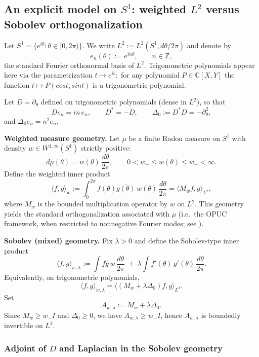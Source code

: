 \documentclass{amsart}
\numberwithin{equation}{section}
\theoremstyle{definition}
\theoremstyle{remark}
\begin{document}
\subsection{An explicit model on $S^1$: weighted $L^2$ versus Sobolev orthogonalization}
\label{subsec:S1-explicit}

Let $S^1=\{e^{i\theta}:\theta\in[0,2\pi)\}$.
We write $L^2:=L^2(S^1,d\theta/2\pi)$ and denote by
\[
e_n(\theta):=e^{in\theta},\qquad n\in\mathbb Z,
\]
the standard Fourier orthonormal basis of $L^2$.
Trigonometric polynomials appear here via the parametrization 
$t \mapsto e^{it}:$ for any 
polynomial $P \in \mathbb{C}[X,Y]$ the function 
$t \mapsto P(cost,sint)$ is a trigonometric polynomial.

Let $D=\partial_\theta$ defined on trigonometric polynomials (dense in $L^2$), so that
\[
De_n = in\,e_n,\qquad D^*=-D,\qquad \Delta_0:=D^*D=-\partial_\theta^2,
\]
and $\Delta_0 e_n = n^2 e_n$.

\medskip
\noindent\textbf{Weighted measure geometry.}
Let $\mu$ be a finite Radon measure on $S^1$ with density $w\in W^{1,\infty}(S^1)$
strictly positive:
\[
d\mu(\theta)=w(\theta)\,\frac{d\theta}{2\pi},\qquad
0<w_- \le w(\theta)\le w_+<\infty.
\]
Define the weighted inner product
\[
\langle f,g\rangle_{w}:=\int_0^{2\pi} f(\theta)\overline{g(\theta)}\,w(\theta)\,\frac{d\theta}{2\pi}
=\langle M_w f, g\rangle_{L^2},
\]
where $M_w$ is the bounded multiplication operator by $w$ on $L^2$.
This geometry yields the standard orthogonalization associated with $\mu$
(i.e.\ the OPUC framework, when restricted to nonnegative Fourier modes; see \cite{SimonOPUC1,Szego}).

\medskip
\noindent\textbf{Sobolev (mixed) geometry.}
Fix $\lambda>0$ and define the Sobolev-type inner product
\begin{equation}\label{eq:S1-mixed-Sobolev}
\langle f,g\rangle_{w,\lambda}
:=
\int f\overline{g}\,w\,\frac{d\theta}{2\pi}
\;+\;
\lambda\int f'(\theta)\,\overline{g'(\theta)}\,\frac{d\theta}{2\pi}.
\end{equation}
Equivalently, on trigonometric polynomials,
\begin{equation}\label{eq:Riesz-map-A}
\langle f,g\rangle_{w,\lambda}
=
\langle (M_w+\lambda \Delta_0)f, g\rangle_{L^2}.
\end{equation}
Set
\[
A_{w,\lambda}:=M_w+\lambda\Delta_0.
\]
Since $M_w\ge w_- I$ and $\Delta_0\ge 0$, we have $A_{w,\lambda}\ge w_- I$, hence
$A_{w,\lambda}$ is boundedly invertible on $L^2$.

\subsubsection{Adjoint of $D$ and Laplacian in the Sobolev geometry}
\end{document}

